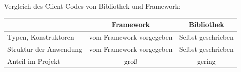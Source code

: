 Vergleich des Client Codes von Bibliothek und Framework:

\begin{tabular}{ |l|c|c| } 
    \hline
                                                            & Framework & Bibliothek \\ 
                                                            \hline
    Typen, Konstruktoren                                    & vom Framework vorgegeben  & Selbst geschrieben \\ 
    \hline
    Struktur der Anwendung                                  & vom Framework vorgegeben  & Selbst geschrieben \\
    \hline
    Anteil im Projekt                                       & groß       & gering \\ 
    \hline
\end{tabular}